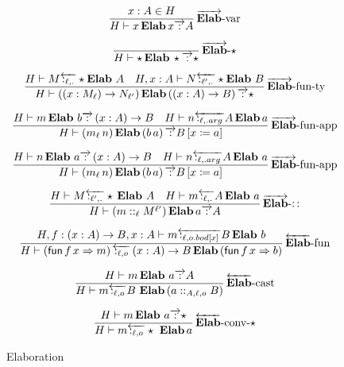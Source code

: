 \begin{figure}
\[
\frac{x:A\in H}{H\vdash x\,\textbf{Elab}\,x\overrightarrow{\,:\,}A}\operatorname{\overrightarrow{\textbf{Elab}}-var}
\]

\[
\frac{\,}{H\vdash\star\,\textbf{Elab}\,\star\overrightarrow{\,:\,}\star}\operatorname{\overrightarrow{\textbf{Elab}}-\star}
\]

\[
\frac{H\vdash M\overleftarrow{\,:_{\ell,.}\,}\star\textbf{Elab}\ A\quad H,x:A\vdash N\overleftarrow{\,:_{\ell',.}\,}\star\textbf{Elab}\ B}{H\vdash\left(\left(x:M_{\ensuremath{\ell}}\right)\rightarrow N_{\ensuremath{\ell'}}\right)\textbf{Elab}\left(\left(x:A\right)\rightarrow B\right)\overrightarrow{\,:\,}\star}\rulename{\overrightarrow{\textbf{Elab}}-fun-ty}
\]

\[
\frac{H\vdash m\,\textbf{Elab}\ b\overrightarrow{\,:\,}\left(x:A\right)\rightarrow B\quad H\vdash n\overleftarrow{\,:_{\ell,.arg}\,}A\,\textbf{Elab}\,a}{H\vdash\left(m_{\ell}\,n\right)\textbf{Elab}\left(b\,a\right)\overrightarrow{\,:\,}B\left[x\coloneqq a\right]}\rulename{\overrightarrow{\textbf{Elab}}-fun-app}
\]

\[
\frac{H\vdash n\,\textbf{Elab}\ a\overrightarrow{\,:\,}\left(x:A\right)\rightarrow B\quad H\vdash n\overleftarrow{\,:_{\ell,.arg}\,}A\,\textbf{Elab}\ a}{H\vdash\left(m_{\ell}\,n\right)\textbf{Elab}\left(b\,a\right)\overrightarrow{\,:\,}B\left[x\coloneqq a\right]}\rulename{\overrightarrow{\textbf{Elab}}-fun-app}
\]

\[
\frac{H\vdash M\overleftarrow{\,:_{\ell',.}\,}\star\,\textbf{Elab}\ A\quad H\vdash m\overleftarrow{\,:_{\ell,.}\,}A\,\textbf{Elab}\ a}{H\vdash\left(m::_{\ell}M^{\ell'}\right)\textbf{Elab}\,a\overrightarrow{\,:\,}A}\rulename{\overrightarrow{\textbf{Elab}}-::}
\]

\[
\frac{H,f:\left(x:A\right)\rightarrow B,x:A\vdash m\overleftarrow{\,:_{\ell,o.bod[x]}\,}B\,\textbf{Elab}\ b}{H\vdash\left(\mathsf{fun}\,f\,x\Rightarrow m\right)\overleftarrow{\,:_{\ell,o}\,}\left(x:A\right)\rightarrow B\,\textbf{Elab}\left(\mathsf{fun}\,f\,x\Rightarrow b\right)}\rulename{\overleftarrow{\textbf{Elab}}-fun}
\]

\[
\frac{H\vdash m\,\textbf{Elab}\ a\overrightarrow{\,:\,}A}{H\vdash m\overleftarrow{\,:_{\ell,o}\,}B\ \textbf{Elab}\left(a::_{A,\ensuremath{\ell},o}B\right)}\rulename{\overleftarrow{\textbf{Elab}}-cast}
\]

\[
\frac{H\vdash m\,\textbf{Elab}\ a\overrightarrow{\,:\,}\star}{H\vdash m\overleftarrow{\,:_{\ell,o}\,}\star\ \textbf{Elab}\,a}\rulename{\overleftarrow{\textbf{Elab}}-conv-\star}
\]


\caption{Elaboration}
\label{fig:elaboration}
\end{figure}

